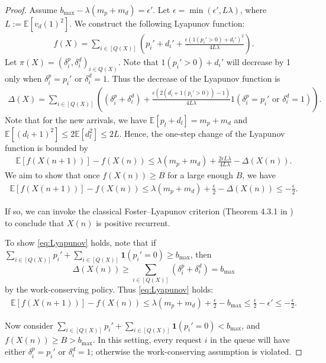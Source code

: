 \documentclass[11pt]{article}
\theoremstyle{plain}
\theoremstyle{definition}
\theoremstyle{remark}
\newcommand{\E}{\mathbb{E}}
\begin{document}
\begin{proof}
    Assume $b_{\max} - \lambda (m_p+m_d) = \epsilon'.$ Let $\epsilon = \min(\epsilon', L\lambda)$, where $L := \E[v_d(1)^2]$. We construct the following Lyapunov function:
    \begin{align*}
        f(X) = \sum_{i \in [Q(X)]} \left(p_{i}' + d_{i}' + \frac{\epsilon (1(p_{i}'>0)+d_{i}')^2}{4L\lambda}\right).
    \end{align*}
    Let $\pi(X) = (\delta_{i}^{p}, \delta_{i}^{d})_{i\in Q(X)}$. Note that $1(p_{i}'>0)+d_{i}'$ will decrease by 1 only when $\delta_{i}^{p}=p_{i}'$ or $\delta_{i}^{d}=1$. Thus the decrease of the Lyapunov function is
    \begin{align*}
    	\Delta(X) = \sum_{i \in [Q(X)]} \left((\delta_{i}^{p} + \delta_{i}^{d}) + \frac{\epsilon (2(d_{i}^{'}+1(p_i'>0))-1)}{4L\lambda} 1(\delta_{i}^{p}=p_{i}' \text{ or } \delta_{i}^{d}=1) \right).
    \end{align*}
   Note that for the new arrivals, we have $\E[p_l+d_l] = m_p+m_d$ and $\E[(d_l+1)^2] \leq 2\E[d_l^2] \leq 2L$. Hence, the one-step change of the Lyapunov function is bounded by
    \begin{align*}
    \E[f(X(n+1))] - f(X(n)) \leq  \lambda (m_p+m_d) + \frac{2\epsilon L\lambda }{4L\lambda } - \Delta(X(n)).
\end{align*}
    We aim to show that once $f(X(n)) \geq B$ for a large enough $B$, we have
    \begin{align}
    \E[f(X(n+1))] - f(X(n)) \leq \lambda (m_p+m_d) + \frac{\epsilon}{2} - \Delta(X(n)) \leq - \frac{\epsilon}{2}. \label{eq:Lyapunov}
    \end{align}

If so, we can invoke the classical Foster--Lyapunov criterion (Theorem 4.3.1 in \citep{xu2023drift}) to conclude that $X(n)$ is positive recurrent.

To show \cref{eq:Lyapunov} holds, note that if $\sum_{i \in [Q(X)]} p_{i}' +  \sum_{i \in [Q(X)]} \mathbf{1}(p_{i}'=0) \geq b_{\max}$, then
$$
\Delta(X(n)) \geq  \sum_{i \in [Q(X)]} (\delta_{i}^{p} + \delta_{i}^{d}) = b_{\max}
$$
by the work-conserving policy. Thus \cref{eq:Lyapunov} holds:
\begin{align*}
 \E[f(X(n+1))] - f(X(n)) \leq \lambda (m_p+m_d) + \frac{\epsilon}{2} - b_{\max} \leq  \frac{\epsilon}{2}  - \epsilon' \leq -\frac{\epsilon}{2}.
\end{align*}

Now consider $\sum_{i \in [Q(X)]} p_{i}' + \sum_{i \in [Q(X)]} \mathbf{1}(p_{i}'=0) < b_{\max}$, and $f(X(n)) \geq B > b_{\max}$. In this setting, every request $i$ in the queue will have either $\delta_{i}^{p}=p_{i}'$ or $\delta_{i}^{d}=1$; otherwise the work-conserving assumption is violated.


\end{proof}
\end{document}
